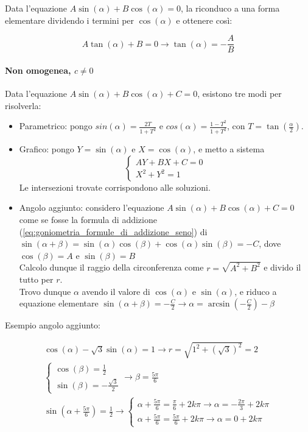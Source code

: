 Data l'equazione $A\sin(\alpha) + B\cos(\alpha) = 0$, la riconduco a una forma elementare dividendo i termini per $\cos(\alpha)$ e ottenere così:

\begin{equation*}
    A\tan(\alpha)+B = 0 \rightarrow \tan(\alpha) = -\frac{A}{B}
\end{equation*}

\paragraph{Non omogenea, $c \neq 0$}

Data l'equazione $A\sin(\alpha) + B\cos(\alpha) + C= 0$, esistono tre modi per risolverla:

\begin{itemize}
    \item Parametrico: pongo $sin(\alpha) = \frac{2T}{1+T^2}$ e $cos(\alpha) = \frac{1-T^2}{1+T^2}$, con $T = \tan(\frac{\alpha}{2})$.
    \item Grafico: pongo $Y =\sin(\alpha)$ e $X = \cos(\alpha)$, e metto a sistema
          \[
              \begin{cases}
                  AY + BX + C = 0 \\
                  X^2 + Y^2 = 1
              \end{cases}
          \]
          Le intersezioni trovate corrispondono alle soluzioni.
    \item Angolo aggiunto: considero l'equazione $A\sin(\alpha) + B\cos(\alpha) + C = 0$  come se fosse la formula di addizione (\ref{eq:goniometria_formule_di_addizione_seno}) di $\sin(\alpha + \beta) = \sin(\alpha)\cos(\beta)+\cos(\alpha)\sin(\beta) = - C$, dove $\cos(\beta) = A$ e $\sin(\beta) = B$ \\
          Calcolo dunque il raggio della circonferenza come $r = \sqrt{A^2 + B^2}$ e divido il tutto per $r$. \\
          Trovo dunque $\alpha$ avendo il valore di $\cos(\alpha)$ e $\sin(\alpha)$, e riduco a equazione elementare $\sin(\alpha + \beta) = -\frac{C}{2} \rightarrow \alpha = \arcsin(-\frac{C}{2}) - \beta$
\end{itemize}

Esempio angolo aggiunto:

\begin{gather}
    \cos(\alpha) - \sqrt{3}\sin(\alpha) = 1 \rightarrow r = \sqrt{1^2 + (\sqrt{3})^2} = 2 \\
    \begin{cases}
        \cos(\beta) = \frac{1}{2} \\
        \sin(\beta) = -\frac{\sqrt{3}}{2}
    \end{cases}
    \rightarrow \beta = \frac{5\pi}{6} \\
    \sin(\alpha + \frac{5\pi}{6}) = \frac{1}{2} \rightarrow \begin{cases}
        \alpha + \frac{5\pi}{6} = \frac{\pi}{6} + 2k\pi \rightarrow \alpha = -\frac{2\pi}{3} + 2k\pi \\
        \alpha + \frac{5\pi}{6} = \frac{5\pi}{6} + 2k\pi \rightarrow \alpha = 0 + 2k\pi
    \end{cases}
\end{gather}

